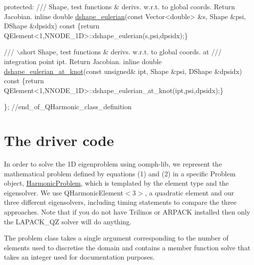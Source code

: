 \begin{DoxyCodeInclude}
\textcolor{keyword}{protected}:
\textcolor{comment}{}
\textcolor{comment}{/// Shape, test functions & derivs. w.r.t. to global coords. Return Jacobian.}
\textcolor{comment}{} \textcolor{keyword}{inline} \textcolor{keywordtype}{double} \hyperlink{classQHarmonicElement_a206b7334e82cb563d7d575deb9f755b1}{dshape\_eulerian}(\textcolor{keyword}{const} Vector<double> &s, 
                               Shape &psi, 
                               DShape &dpsidx)\textcolor{keyword}{ const}
\textcolor{keyword}{  }\{\textcolor{keywordflow}{return} QElement<1,NNODE\_1D>::dshape\_eulerian(s,psi,dpsidx);\}
 
\textcolor{comment}{}
\textcolor{comment}{ /// \(\backslash\)short Shape, test functions & derivs. w.r.t. to global coords. at}
\textcolor{comment}{ /// integration point ipt. Return Jacobian.}
\textcolor{comment}{} \textcolor{keyword}{inline} \textcolor{keywordtype}{double} \hyperlink{classQHarmonicElement_a6b11b5a42bd20c4e1d1e9840ba22a80a}{dshape\_eulerian\_at\_knot}(\textcolor{keyword}{const} \textcolor{keywordtype}{unsigned}& ipt,
                                       Shape &psi, 
                                       DShape &dpsidx)\textcolor{keyword}{ const}
\textcolor{keyword}{  }\{\textcolor{keywordflow}{return} QElement<1,NNODE\_1D>::dshape\_eulerian\_at\_knot(ipt,psi,dpsidx);\}

\}; \textcolor{comment}{//end\_of\_QHarmonic\_class\_definition}

\end{DoxyCodeInclude}
\hypertarget{index_main}{}\section{The driver code}\label{index_main}
In order to solve the 1D eigenproblem using {\ttfamily oomph-\/lib}, we represent the mathematical problem defined by equations (1) and (2) in a specific {\ttfamily Problem} object, {\ttfamily \hyperlink{classHarmonicProblem}{Harmonic\+Problem}}, which is templated by the element type and the eigensolver. We use {\ttfamily Q\+Harmonic\+Element$<$3$>$}, a quadratic element and our three different eigensolvers, including timing statements to compare the three approaches. Note that if you do not have Trilinos or A\+R\+P\+A\+CK installed then only the L\+A\+P\+A\+C\+K\+\_\+\+QZ solver will do anything.

The problem class takes a single argument corresponding to the number of elements used to discretise the domain and contains a member function {\ttfamily solve} that takes an integer used for documentation purposes.


